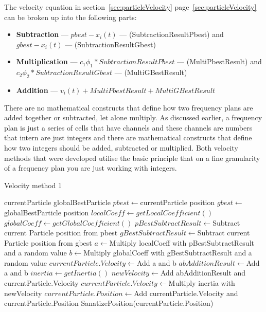 The velocity equation in section~\ref{sec:particleVelocity} page~\ref{sec:particleVelocity} can be broken up into the following parts:
\label{lst:velocitybreakup}
\begin{itemize}
\item \textbf{Subtraction} --- $pbest - x_i(t)$ --- (SubtractionResultPbest) and $gbest - x_i(t)$ --- (SubtractionResultGbest)
\item \textbf{Multiplication} --- $c_1\phi_1 * SubtractionResultPbest$ --- (MultiPbestResult) and $c_2\phi_2 * SubtractionResultGbest$ --- (MultiGBestResult)
\item \textbf{Addition} --- $v_i(t) + MultiPbestResult + MultiGBestResult$
\end{itemize}
There are no mathematical constructs that define how two frequency plans are added together or subtracted, let alone multiply. As discussed earlier, a frequency plan is just a series of cells that have channels and these channels are numbers that intern are just integers and there are mathematical constructs that define how two integers should be added, subtracted or multiplied. Both velocity methods that were developed utilise the basic principle that on a fine granularity of a frequency plan you are just working with integers.

\begin{algorithm}
\caption{Velocity method 1}
\label{alg:velocitymethod1}
	\begin{algorithmic}[1]
	\REQUIRE currentParticle
	\REQUIRE globalBestParticle
	\STATE $pbest \leftarrow $currentParticle position
	\STATE $gbest \leftarrow $globalBestParticle position
	\STATE $localCoeff \leftarrow getLocalCoefficient()$
	\STATE $globalCoeff \leftarrow getGlobalCoefficient()$
	\STATE $pBestSubtractResult \leftarrow $Subtract current Particle position from pbest
	\STATE $gBestSubtractResult \leftarrow $Subtract current Particle position from gbest
	\STATE $a \leftarrow $Multiply localCoeff with pBestSubtractResult and a random value
	\STATE $b \leftarrow $Multiply globalCoeff with gBestSubtractResult and a random value
		\STATE $currentParticle.Velocity \leftarrow $Add a and b
	\ELSE
		\STATE $abAdditionResult \leftarrow $Add a and b
		\STATE $inertia \leftarrow getInertia()$
		\STATE $newVelocity \leftarrow $Add abAdditionResult and currentParticle.Velocity
		\STATE $currentParticle.Velocity \leftarrow $Multiply inertia with newVelocity
	\ENDIF
	\STATE $currentParticle.Position \leftarrow $Add currentParticle.Velocity and currentParticle.Position
	\STATE SanatizePosition(currentParticle.Position)
	\end{algorithmic}
\end{algorithm}

